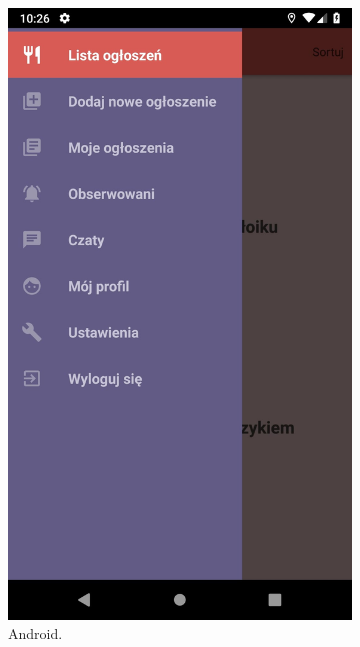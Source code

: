\documentclass[licencjacka]{pracamgr}
\begin{document}
\newpage
\begin{figure}[h!]
  \centering
  \begin{subfigure}[b]{0.4\linewidth}
    \includegraphics[width=\linewidth]{android3.jpg}
    \caption{Android.}
  \end{subfigure}
  \begin{subfigure}[b]{0.4\linewidth}

\end{subfigure}
\end{figure}
\end{document}
